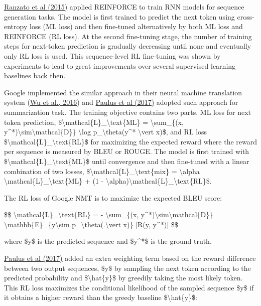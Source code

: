 \href{https://arxiv.org/abs/1511.06732}{Ranzato et al (2015)} applied REINFORCE to train RNN models for sequence generation tasks. The model is first trained to predict the next token using cross-entropy loss (ML loss) and then fine-tuned alternatively by both ML loss and REINFORCE (RL loss). At the second fine-tuning stage, the number of training steps for next-token prediction is gradually decreasing until none and eventually only RL loss is used. This sequence-level RL fine-tuning was shown by experiments to lead to great improvements over several supervised learning baselines back then.

Google implemented the similar approach in their neural machine translation system (\href{https://arxiv.org/abs/1609.08144}{Wu et al., 2016}) and \href{https://arxiv.org/abs/1705.04304}{Paulus et al (2017)} adopted such approach for summarization task. The training objective contains two parts, ML loss for next token prediction, \$\textbackslash mathcal\{L\}\_\textbackslash text\{ML\} = \textbackslash sum\_\{(x, y\^{}*)\textbackslash sim\textbackslash mathcal\{D\}\} \textbackslash log p\_\textbackslash theta(y\^{}* \textbackslash vert x)\$, and RL loss \$\textbackslash mathcal\{L\}\_\textbackslash text\{RL\}\$ for maximizing the expected reward where the reward per sequence is measured by BLEU or ROUGE. The model is first trained with \$\textbackslash mathcal\{L\}\_\textbackslash text\{ML\}\$ until convergence and then fine-tuned with a linear combination of two losses, \$\textbackslash mathcal\{L\}\_\textbackslash text\{mix\} = \textbackslash alpha \textbackslash mathcal\{L\}\_\textbackslash text\{ML\} + (1 - \textbackslash alpha)\textbackslash mathcal\{L\}\_\textbackslash text\{RL\}\$.

The RL loss of Google NMT is to maximize the expected BLEU score:

\$\$ \textbackslash mathcal\{L\}\_\textbackslash text\{RL\} = - \textbackslash sum\_\{(x, y\^{}*)\textbackslash sim\textbackslash mathcal\{D\}\} \textbackslash mathbb\{E\}\_\{y\textbackslash sim p\_\textbackslash theta(.\textbackslash vert x)\} {[}R(y, y\^{}*){]} \$\$

where \$y\$ is the predicted sequence and \$y\^{}*\$ is the ground truth.

\href{https://arxiv.org/abs/1705.04304}{Paulus et al (2017)} added an extra weighting term based on the reward difference between two output sequences, \$y\$ by sampling the next token according to the predicted probability and \$\textbackslash hat\{y\}\$ by greedily taking the most likely token. This RL loss maximizes the conditional likelihood of the sampled sequence \$y\$ if it obtains a higher reward than the greedy baseline \$\textbackslash hat\{y\}\$:

